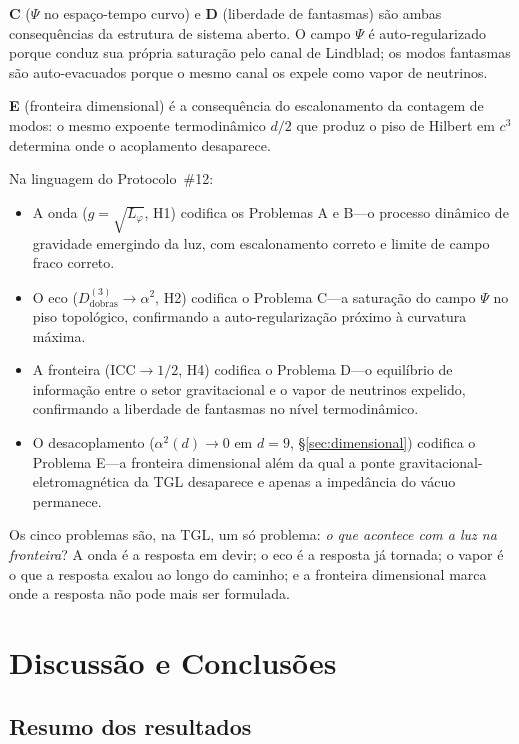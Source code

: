 \documentclass[12pt,a4paper,twocolumn]{article}
\newcommand{\alphaii}{\alpha^{2}}
\newcommand{\CCI}{\text{ICC}}
\begin{document}
\textbf{C} ($\Psi$ no espaço-tempo curvo) e \textbf{D} (liberdade de fantasmas)
são ambas consequências da estrutura de sistema aberto. O campo $\Psi$ é
auto-regularizado porque conduz sua própria saturação pelo canal de Lindblad;
os modos fantasmas são auto-evacuados porque o mesmo canal os expele como
vapor de neutrinos.

\textbf{E} (fronteira dimensional) é a consequência do escalonamento da contagem
de modos: o mesmo expoente termodinâmico $d/2$ que produz o piso de Hilbert
em $c^3$ determina onde o acoplamento desaparece.

Na linguagem do Protocolo~\#12:
\begin{itemize}[nosep]
\item A onda ($g = \sqrt{L_\varphi}$, H1) codifica os Problemas A e B---o
processo dinâmico de gravidade emergindo da luz, com escalonamento correto
e limite de campo fraco correto.
\item O eco ($D_{\text{dobras}}^{(3)} \to \alphaii$, H2) codifica o Problema
C---a saturação do campo $\Psi$ no piso topológico, confirmando a
auto-regularização próximo à curvatura máxima.
\item A fronteira ($\CCI \to 1/2$, H4) codifica o Problema D---o equilíbrio
de informação entre o setor gravitacional e o vapor de neutrinos expelido,
confirmando a liberdade de fantasmas no nível termodinâmico.
\item O desacoplamento ($\alpha^2(d) \to 0$ em $d = 9$, \S\ref{sec:dimensional}) codifica o Problema E---a fronteira dimensional além da qual a ponte gravitacional-eletromagnética da TGL desaparece e apenas a impedância do vácuo permanece.
\end{itemize}

Os cinco problemas são, na TGL, um só problema:
\emph{o que acontece com a luz na fronteira}? A onda é a resposta em
devir; o eco é a resposta já tornada; o vapor é o que a resposta exalou ao
longo do caminho; e a fronteira dimensional marca onde a resposta não pode
mais ser formulada.


\section{Discussão e Conclusões}
\label{sec:discussion}

\subsection{Resumo dos resultados}
\end{document}
